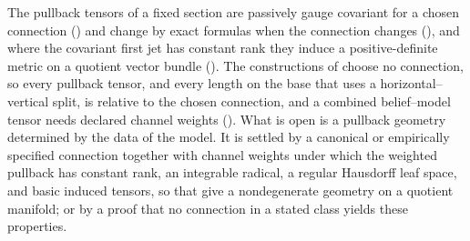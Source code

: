 The pullback tensors of a fixed section are passively gauge covariant for a chosen connection
() and change by exact formulas when the connection changes
(), and where the covariant first jet has constant rank they
induce a positive-definite metric on a quotient vector bundle ().
The constructions of  choose no connection, so every pullback tensor, and
every length on the base that uses a horizontal--vertical split, is relative to the chosen connection,
and a combined belief--model tensor needs declared channel weights
(). What is open is a pullback geometry determined by the data
of the model. It is settled by a canonical or empirically specified connection together with channel
weights under which the weighted pullback has constant rank, an integrable radical, a regular Hausdorff
leaf space, and basic induced tensors, so that
 give a nondegenerate
geometry on a quotient manifold; or by a proof that no connection in a stated class yields these
properties.

